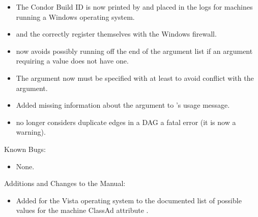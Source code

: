 \begin{itemize}

\item The Condor Build ID is now printed by  and placed 
  in the logs for machines running a Windows operating system.

\item {} and the  correctly register 
  themselves with the Windows firewall.

\item {} now avoids possibly running off the end
of the argument list if an argument requiring a value does not have one.

\item The   argument now must be
specified with at least  to avoid conflict with the
 argument.

\item Added missing information about the  argument to
's usage message.

\item {} no longer considers duplicate edges in a DAG a
fatal error (it is now a warning).

\end{itemize}

\noindent Known Bugs:

\begin{itemize}

\item None.

\end{itemize}

\noindent Additions and Changes to the Manual:

\begin{itemize}

\item Added  for the Vista operating system to
  the documented list of possible values for the machine ClassAd
  attribute .

\end{itemize}

